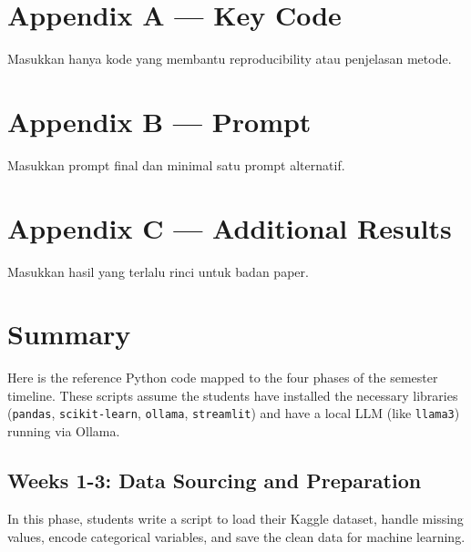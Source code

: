 \documentclass[
  indonesian,
  letterpaper,
  DIV=11,
  numbers=noendperiod]{scrreprt}
\begin{document}
\chapter{Appendix A --- Key Code}\label{appendix-a-key-code}

Masukkan hanya kode yang membantu reproducibility atau penjelasan
metode.

\chapter{Appendix B --- Prompt}\label{appendix-b-prompt}

Masukkan prompt final dan minimal satu prompt alternatif.

\chapter{Appendix C --- Additional
Results}\label{appendix-c-additional-results}

Masukkan hasil yang terlalu rinci untuk badan paper.


\chapter{Summary}\label{summary}

Here is the reference Python code mapped to the four phases of the
semester timeline. These scripts assume the students have installed the
necessary libraries (\texttt{pandas}, \texttt{scikit-learn},
\texttt{ollama}, \texttt{streamlit}) and have a local LLM (like
\texttt{llama3}) running via Ollama.

\section{Weeks 1-3: Data Sourcing and
Preparation}\label{weeks-1-3-data-sourcing-and-preparation}

In this phase, students write a script to load their Kaggle dataset,
handle missing values, encode categorical variables, and save the clean
data for machine learning.
\end{document}
